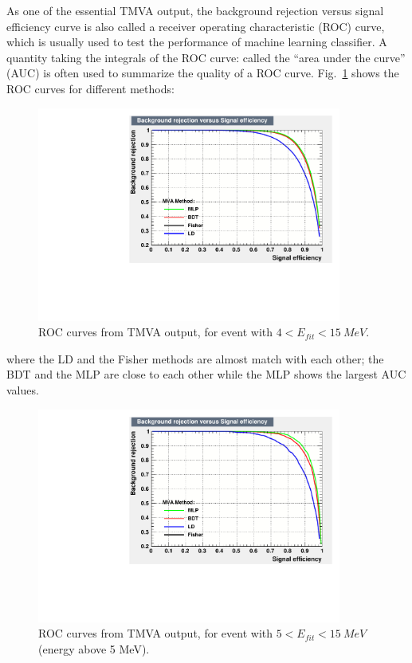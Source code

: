 As one of the essential TMVA output, the background rejection versus signal efficiency curve is also called a receiver operating characteristic (ROC) curve, which is usually used to test the performance of machine learning classifier. A quantity taking the integrals of the ROC curve: called the ``area under the curve'' (AUC) is often used to summarize the quality of a ROC curve\cite{murphy2012machine}.  Fig.~\ref{allE_roc} shows the ROC curves for different methods:
\begin{figure}[!htb]
	\centering
	\includegraphics[width=10cm]{ROC_allE.pdf}
	\caption{ROC curves from TMVA output, for event with $4<E_{fit}<15~MeV$.}
	\label{allE_roc}
\end{figure}
where the LD and the Fisher methods are almost match with each other; the BDT and the MLP are close to each other while the MLP shows the largest AUC values.


\begin{figure}[!htb]
	\centering
	\includegraphics[width=10cm]{ROC_hiE.pdf}
	\caption{ROC curves from TMVA output, for event with $5<E_{fit}<15~MeV$ (energy above 5 MeV).}
	\label{E5to15_roc}
\end{figure}

